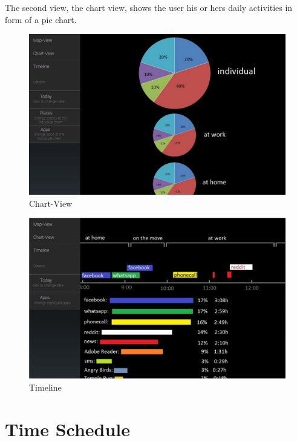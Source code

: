 The second view, the chart view, shows the user his or hers daily activities in form of a pie chart.

\begin{figure}[h]
	\caption{Chart-View}
	\includegraphics[width=\textwidth]{images/Design/2_ChartView.jpg}
\end{figure}

\begin{figure}[h]
	\caption{Timeline}
	\includegraphics[width=\textwidth]{images/Design/3_TimeLine.jpg}
\end{figure}

\newpage
\section{Time Schedule}
\label{subsec:time_schedule}

